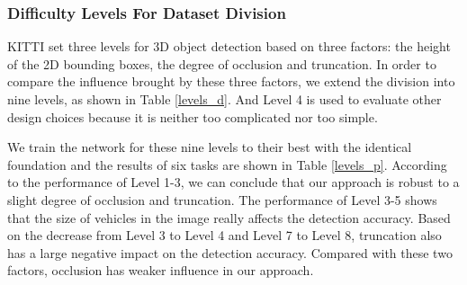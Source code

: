 \documentclass[a4paper,12pt]{article}
\begin{document}
\subsubsection{Difficulty Levels For Dataset Division}
KITTI set three levels for 3D object detection based on three factors: the height of the 2D bounding boxes, the degree of occlusion and truncation. In order to compare the influence brought by these three factors, we extend the division into nine levels, as shown in Table \ref{levels_d}. And Level 4 is used to evaluate other design choices because it is neither too complicated nor too simple.

\renewcommand{\arraystretch}{1.0}
\begin{table}[H]
	\centering
	\caption[Levels of difficulty.]{Levels of difficulty. Level 2, 6, and 8 corresponds to the Easy, Moderate, and Hard defined by KITTI \cite{Geiger2012CVPR}.}
	\label{levels_d}
\end{table}

We train the network for these nine levels to their best with the identical foundation and the results of six tasks are shown in Table \ref{levels_p}. According to the performance of Level 1-3, we can conclude that our approach is robust to a slight degree of occlusion and truncation.  The performance of Level 3-5 shows that the size of vehicles in the image really affects the detection accuracy. Based on the decrease from Level 3 to Level 4 and Level 7 to Level 8, truncation also has a large negative impact on the detection accuracy. Compared with these two factors, occlusion has weaker influence in our approach. 
\end{document}
